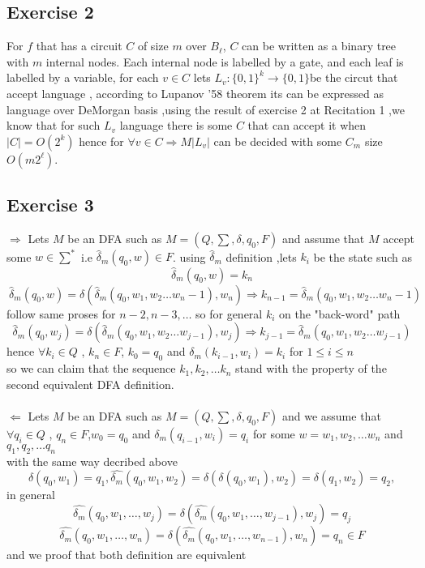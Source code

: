 \documentclass[12pt]{article}
\begin{document}
\subsection{Exercise 2}
For $f$ that has a circuit $C$ of size $m$ over $B_\ell$,
$C$ can be written as a binary tree with $m$ internal nodes. Each internal node is
labelled by a gate, and each leaf is labelled by a variable,
for each $v \in C$ lets $L_v: \lbrace0, 1\rbrace
^k \rightarrow \lbrace0, 1\rbrace $be the circut that accept language , according to Lupanov '58 theorem its can be expressed as language over DeMorgan basis ,using the result of exercise 2 at Recitation 1 ,we know that for such $L_v$ language there is some $C$ that can accept it when  $|C|=O(2^k)$
hence for $\forall v \in C \Rightarrow M|L_v|$ can be decided with some $C_m$ size $O(m2^\ell)$.
\subsection{Exercise 3}
$\Longrightarrow$ Lets $M$ be an DFA such as $M=(Q,\sum,\delta,q_0,F)$ and assume that $M$ accept some $w \in \sum ^*
$ i.e $\hat{\delta}_{m}  (q_0,w) \in F$. using $\hat{\delta}_{m}$ definition ,lets $k_i$ be the state such as 
\[
\ \hat{\delta}_{m} (q_0,w)=k_{n}
\]
\[
\ \hat{\delta}_{m} (q_0,w)=\delta (\hat{\delta}_{m} (q_0,w_1,w_2\dots w_n-1),w_n)\Rightarrow k_{n-1}=\hat{\delta}_{m} (q_0,w_1,w_2\dots w_n-1)
\]
follow same proses for $n-2,n-3,\dots$ so for general $k_i$ on the "back-word" path
\[
\ \hat{\delta}_{m} (q_0,w_j)=\delta (\hat{\delta}_{m} (q_0,w_1,w_2\dots w_{j-1}),w_j)\Rightarrow k_{j-1}=\hat{\delta}_{m} (q_0,w_1,w_2\dots w_{j-1})
\]
hence $\forall k_i \in Q$ , $k_n \in F$,  $k_0=q_0$ and $\delta_m (k_{i-1},w_i)=k_i$ for $1 \leq i \leq n$ \\so we can claim that the sequence $k_1,k_2,\dots k_n$ stand with the property of the second equivalent DFA definition.\\\\
$\Longleftarrow$ Lets $M$ be an DFA such as $M=(Q,\sum,\delta,q_0,F)$ and we assume that\\ $\forall q_i \in Q$ , $q_n \in F$,$w_0=q_0$ and $\delta_m (q_{i-1},w_i)=q_i$ for some $w=w_1,w_2, \dots w_n$ and $q_1,q_2, \dots q_n$
\\ with the same way decribed above 
\[
\ \delta (q_0,w_1)=q_1,\hat{\delta_m}(q_0,w_1,w_2)=\delta ( \delta (q_0,w_1),w_2)=\delta( q_1,w_2)=q_2,
\]
in general
\[
\ \hat{\delta_m}(q_0,w_1,\dots ,w_j)=\delta ( \hat{\delta_m} (q_0,w_1,\dots ,w_{j-1}),w_j)=q_j
\]
\[
\ \hat{\delta_m}(q_0,w_1,\dots ,w_n)=\delta ( \hat{\delta_m} (q_0,w_1,\dots ,w_{n-1}),w_n)=q_n \in F
\]
and we proof that both definition are equivalent
\end{document}
